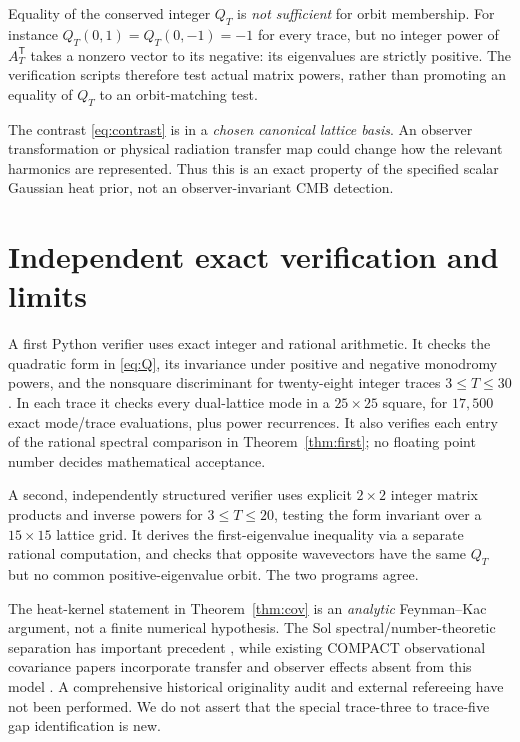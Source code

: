 \documentclass[11pt,a4paper]{article}
\begin{document}
Equality of the conserved integer $Q_T$
is \emph{not sufficient} for orbit membership.
For instance
$Q_T(0,1)=Q_T(0,-1)=-1$ for every trace,
but no integer power of $A_T^{\mathsf T}$
takes a nonzero vector to its negative:
its eigenvalues are strictly positive.
The verification scripts therefore test
actual matrix powers, rather than
promoting an equality of $Q_T$
to an orbit-matching test.

The contrast \eqref{eq:contrast} is in a
\emph{chosen canonical lattice basis}.
An observer transformation or physical
radiation transfer map could change how
the relevant harmonics are represented.
Thus this is an exact property of the
specified scalar Gaussian heat prior,
not an observer-invariant CMB detection.


\section{Independent exact verification and limits}
A first Python verifier uses exact integer and rational
arithmetic. It checks the quadratic form in
\eqref{eq:Q}, its invariance under positive
and negative monodromy powers, and the
nonsquare discriminant for twenty-eight
integer traces $3\le T\le30$. In each trace
it checks every dual-lattice mode in a
$25\times25$ square, for $17{,}500$ exact
mode/trace evaluations, plus power recurrences.
It also verifies each entry of the rational
spectral comparison in
Theorem~\ref{thm:first}; no floating point
number decides mathematical acceptance.

A second, independently structured verifier
uses explicit $2\times2$ integer
matrix products and inverse powers for
$3\le T\le20$, testing the form invariant
over a $15\times15$ lattice grid. It derives
the first-eigenvalue inequality via a
separate rational computation, and checks
that opposite wavevectors have the same
$Q_T$ but no common positive-eigenvalue
orbit. The two programs agree.

The heat-kernel statement in
Theorem~\ref{thm:cov} is an
\emph{analytic} Feynman--Kac argument,
not a finite numerical hypothesis.
The Sol spectral/number-theoretic
separation has important precedent
\cite{bdv}, while existing COMPACT
observational covariance papers
incorporate transfer and observer
effects absent from this model
\cite{compact,overview}.
A comprehensive historical originality
audit and external refereeing have
not been performed. We do not assert
that the special trace-three to
trace-five gap identification is new.
\end{document}
